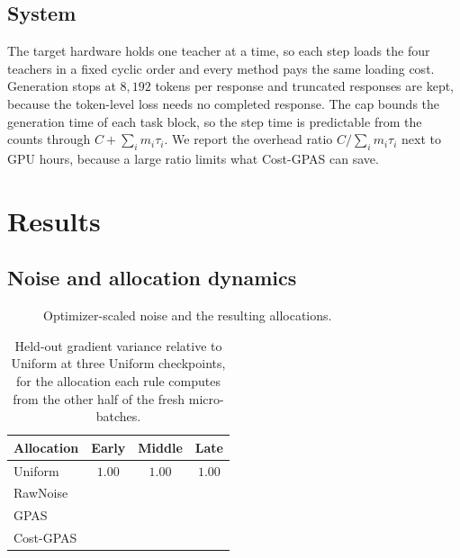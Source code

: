 \subsection{System}

The target hardware holds one teacher at a time, so each step loads the four
teachers in a fixed cyclic order and every method pays the same loading cost.
Generation stops at $8{,}192$ tokens per response and truncated responses are
kept, because the token-level loss needs no completed response. The cap
bounds the generation time of each task block, so the step time is
predictable from the counts through $C+\sum_i m_i\tau_i$. We report the
overhead ratio $C/\sum_i m_i\tau_i$ next to GPU hours, because a large ratio
limits what Cost-GPAS can save.

\section{Results}
\label{sec:results}

\subsection{Noise and allocation dynamics}

\begin{figure}[H]
    \centering
    \caption{Optimizer-scaled noise and the resulting allocations.
    }
    \label{fig:allocation_dynamics}
\end{figure}

\begin{table}[H]
\centering
\small
\caption{Held-out gradient variance relative to Uniform at three Uniform
checkpoints, for the allocation each rule computes from the other half of the
fresh micro-batches. }
\label{tab:heldout_variance}
\begin{tabular}{lccc}
\toprule
Allocation & Early & Middle & Late \\
\midrule
Uniform & $1.00$ & $1.00$ & $1.00$ \\
RawNoise & & & \\
GPAS & & & \\
Cost-GPAS & & & \\
\bottomrule
\end{tabular}
\end{table}

